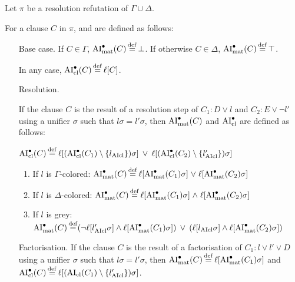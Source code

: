 \documentclass[,%
	paper=a4,%
	DIV10, 
	twoside=false,%
	liststotoc,
	bibtotoc,
	draft=false,%
	numbers=noendperiod
]{scrartcl}
\begin{document}
\begin{defi}
	Let $\pi$ be a resolution refutation of $\Gamma \cup \Delta$.

	For a clause $C$ in $\pi$,  and  are defined as follows:
	\begin{itemize}
		\item[Base case.]
			If $C \in \Gamma$, $\operatorname{AI}_\mathrm{mat}^\bullet(C) \operatorname{\stackrel{\mathrm{def}}{=}} \bot$.
			If otherwise $C \in \Delta$, $\operatorname{AI}_\mathrm{mat}^\bullet(C) \operatorname{\stackrel{\mathrm{def}}{=}} \top$.

			In any case, $\operatorname{AI}_\mathrm{cl}^\bullet(C) \operatorname{\stackrel{\mathrm{def}}{=}} \ell[C]$.
		\item[Resolution.]

			If the clause $C$ is the result of a resolution step of $C_1: D \lor l$ and $C_2: E \lor \lnot l'$ using a unifier $\sigma$ such that $l\sigma =  l'\sigma$, then $\operatorname{AI}_\mathrm{mat}^\bullet(C)$ and $\operatorname{AI}_\mathrm{cl}^\bullet$ are defined as follows:

			$\operatorname{AI}_\mathrm{cl}^\bullet(C) \operatorname{\stackrel{\mathrm{def}}{=}} \ell[(\operatorname{AI}_\mathrm{cl}^\bullet(C_1) \setminus \{l_{\operatorname{AIcl}}\})\sigma] \;\,{\lor}\;\, \ell[(\operatorname{AI}_\mathrm{cl}^\bullet(C_2)\setminus \{l_{\operatorname{AIcl}}'\})\sigma] $

			\begin{enumerate}

				\item If $l$ is $\Gamma$-colored:
					$\operatorname{AI}_\mathrm{mat}^\bullet(C) \operatorname{\stackrel{\mathrm{def}}{=}} \ell[\operatorname{AI}_\mathrm{mat}^\bullet(C_1)\sigma]\;{\lor}\; \ell[\operatorname{AI}_\mathrm{mat}^\bullet(C_2)\sigma] $

				\item If $l$ is $\Delta$-colored:
					$\operatorname{AI}_\mathrm{mat}^\bullet(C) \operatorname{\stackrel{\mathrm{def}}{=}} \ell[\operatorname{AI}_\mathrm{mat}^\bullet(C_1)\sigma]\;{\land}\; \ell[\operatorname{AI}_\mathrm{mat}^\bullet(C_2)\sigma] $

				\item If $l$ is grey:
					$\operatorname{AI}_\mathrm{mat}^\bullet(C) \operatorname{\stackrel{\mathrm{def}}{=}}
					(\lnot {\ell[l'\ensuremath{_{\operatorname{AIcl}}}\sigma]} \land \ell[\operatorname{AI}_\mathrm{mat}^\bullet(C_1)\sigma]) \;\,{\lor}\;\,
					(\ell[l_{\operatorname{AIcl}}\sigma]\land \ell[\operatorname{AI}_\mathrm{mat}^\bullet(C_2)\sigma ])
					$

			\end{enumerate}

		\item[Factorisation.]
			If the clause $C$ is the result of a factorisation of $C_1: l \lor l' \lor D$ using a unifier $\sigma$ such that $l\sigma = l'\sigma$, then $\operatorname{AI}_\mathrm{mat}^\bullet(C) \operatorname{\stackrel{\mathrm{def}}{=}} \ell[\operatorname{AI}_\mathrm{mat}^\bullet(C_1)\sigma]$ and $\AIclpre(C) \defeq \lifboth{ (\AIclause(C_1) \setminus\nolinebreak \{l'\cl\})\sigma}$.
			\qedhere

	\end{itemize}
\end{defi}
\end{document}
